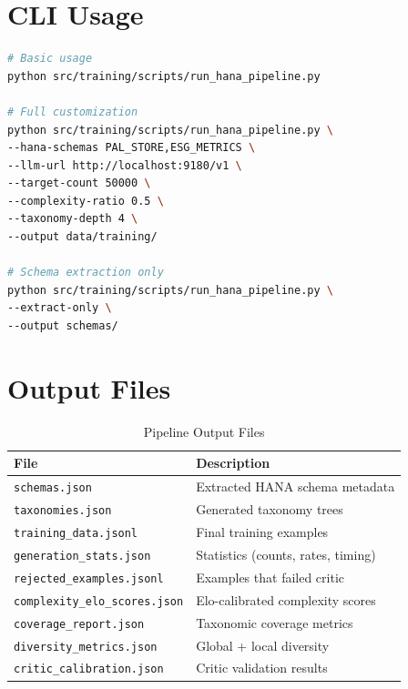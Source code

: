 \documentclass[12pt,a4paper,twoside]{report}
\begin{document}
\section{CLI Usage}

\begin{lstlisting}[language=bash,caption={CLI entry point}]
# Basic usage
python src/training/scripts/run_hana_pipeline.py

# Full customization
python src/training/scripts/run_hana_pipeline.py \
--hana-schemas PAL_STORE,ESG_METRICS \
--llm-url http://localhost:9180/v1 \
--target-count 50000 \
--complexity-ratio 0.5 \
--taxonomy-depth 4 \
--output data/training/

# Schema extraction only
python src/training/scripts/run_hana_pipeline.py \
--extract-only \
--output schemas/
\end{lstlisting}

\section{Output Files}

\begin{table}[H]
\centering
\caption{Pipeline Output Files}
\label{tab:outputs}
\begin{tabularx}{\textwidth}{lX}
\toprule
\textbf{File} & \textbf{Description} \\
\midrule
\texttt{schemas.json} & Extracted HANA schema metadata \\
\texttt{taxonomies.json} & Generated taxonomy trees \\
\texttt{training\_data.jsonl} & Final training examples \\
\texttt{generation\_stats.json} & Statistics (counts, rates, timing) \\
\texttt{rejected\_examples.jsonl} & Examples that failed critic \\
\texttt{complexity\_elo\_scores.json} & Elo-calibrated complexity scores \\
\texttt{coverage\_report.json} & Taxonomic coverage metrics \\
\texttt{diversity\_metrics.json} & Global + local diversity \\
\texttt{critic\_calibration.json} & Critic validation results \\
\bottomrule
\end{tabularx}
\end{table}

\newpage
\end{document}
